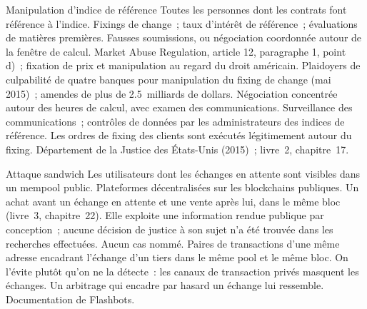 \begin{strategyfile}{Manipulation d'indice de référence}\label{strat:s2:manipulative-strategies-and-how-they-are-caught:benchmark}
 Toutes les personnes dont les contrats font référence à l'indice.
 Fixings de change~; taux d'intérêt de référence~; évaluations de matières premières.
 Fausses soumissions, ou négociation coordonnée autour de la fenêtre de calcul.
 Market Abuse Regulation, article 12, paragraphe 1, point d)~; fixation de prix et manipulation au regard du droit américain.
 Plaidoyers de culpabilité de quatre banques pour manipulation du fixing de change (mai 2015)~; amendes de plus de 2.5~milliards de dollars.
 Négociation concentrée autour des heures de calcul, avec examen des communications.
 Surveillance des communications~; contrôles de données par les administrateurs des indices de référence.
 Les ordres de fixing des clients sont exécutés légitimement autour du fixing.
 Département de la Justice des États-Unis (2015)~; livre~2, chapitre~17.
\end{strategyfile}

\begin{strategyfile}{Attaque sandwich}\label{strat:s2:manipulative-strategies-and-how-they-are-caught:sandwich}
 Les utilisateurs dont les échanges en attente sont visibles dans un mempool public.
 Plateformes décentralisées sur les blockchains publiques.
 Un achat avant un échange en attente et une vente après lui, dans le même bloc (livre~3, chapitre~22).
 Elle exploite une information rendue publique par conception~; aucune décision de justice à son sujet n'a été trouvée dans les recherches effectuées.
 Aucun cas nommé.
 Paires de transactions d'une même adresse encadrant l'échange d'un tiers dans le même pool et le même bloc.
 On l'évite plutôt qu'on ne la détecte~: les canaux de transaction privés masquent les échanges.
 Un arbitrage qui encadre par hasard un échange lui ressemble.
 Documentation de Flashbots.
\end{strategyfile}

